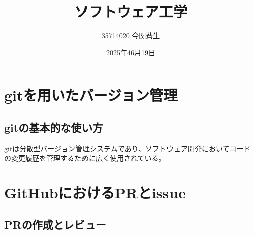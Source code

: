 \documentclass[a4paper,11pt]{ltjsarticle}
\title{ソフトウェア工学}
\author{35714020 今関蒼生}
\date{2025年46月19日}
\begin{document}
\maketitle
%
%
\section{gitを用いたバージョン管理}
\subsection{gitの基本的な使い方}
gitは分散型バージョン管理システムであり、ソフトウェア開発においてコードの変更履歴を管理するために広く使用されている。

\section{GitHubにおけるPRとissue}
\subsection{PRの作成とレビュー}
\end{document}
